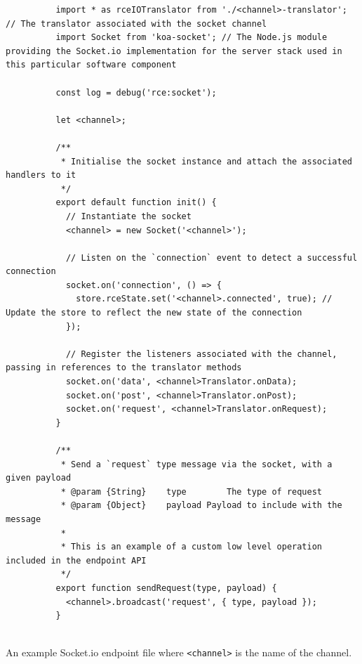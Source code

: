       \begin{code}
        \begin{verbatim}
          import * as rceIOTranslator from './<channel>-translator'; // The translator associated with the socket channel
          import Socket from 'koa-socket'; // The Node.js module providing the Socket.io implementation for the server stack used in this particular software component
          
          const log = debug('rce:socket');
          
          let <channel>;
          
          /**
           * Initialise the socket instance and attach the associated handlers to it
           */
          export default function init() {
            // Instantiate the socket
            <channel> = new Socket('<channel>');
          
            // Listen on the `connection` event to detect a successful connection
            socket.on('connection', () => {
              store.rceState.set('<channel>.connected', true); // Update the store to reflect the new state of the connection
            });
            
            // Register the listeners associated with the channel, passing in references to the translator methods
            socket.on('data', <channel>Translator.onData);
            socket.on('post', <channel>Translator.onPost);
            socket.on('request', <channel>Translator.onRequest);
          }
          
          /**
           * Send a `request` type message via the socket, with a given payload
           * @param	{String}	type		The type of request
           * @param {Object}	payload	Payload to include with the message
           *
           * This is an example of a custom low level operation included in the endpoint API
           */
          export function sendRequest(type, payload) {
            <channel>.broadcast('request', { type, payload });
          }
          
        \end{verbatim}
        \caption{An example Socket.io endpoint file where \texttt{<channel>} is the name of the channel.}
        \label{code:softDev-socketEndpointExample}
      \end{code}
    
